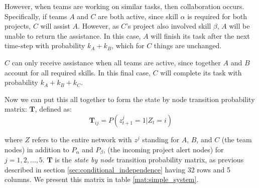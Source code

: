 \begin{steps}
	However, when teams are working on similar tasks, then collaboration occurs. Specifically, if teams $A$ and $C$ are both active, since skill $\alpha$ is required for both projects, $C$ will assist $A$. However, as $C$'s project also involved skill $\beta$, $A$ will be unable to return the assistance. In this case, $A$ will finish its task after the next time-step with probability $k_A + k_B$, which for $C$ things are unchanged. 
	
	$C$ can only receive assistance when all teams are active, since together $A$ and $B$ account for all required skills. In this final case, $C$ will complete its task with probability $k_A+k_B+k_C$.
\end{steps}


Now we can put this all together to form the state by node transition probability matrix: $\mathbf{T}$, defined as:
\begin{equation}
\mathbf{T}_{ij}= P(z^j_{t+1}=1 | Z_t = i)
\end{equation}

where $Z$ refers to the entire network with $z^j$ standing for $A$, $B$, and $C$ (the team nodes) in addition to $P_\alpha$ and $P_\beta$, (the incoming project alert nodes) for $j=1,2, \ldots, 5$. $\mathbf{T}$ is the \textit{state by node} transition probability matrix, as previous described in section \ref{sec:conditional_independence} having 32 rows and 5 columns. We present this matrix in table \ref{mat:simple_system}.


